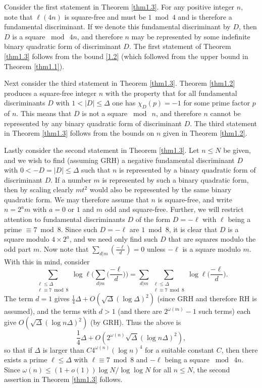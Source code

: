 \documentclass[11pt,makeidx, reqno]{amsart}
\theoremstyle{mystyle}
\theoremstyle{definition}
\begin{document}
 
Consider the first statement in Theorem \ref{thm1.3}.  For any positive integer $n$, note that $\ell(4n)$ is square-free and must be $1\bmod 4$ and is therefore a fundamental discriminant.  If we denote this fundamental discriminant by $D$, then $D$ is a square  $\bmod \ {4n}$, and therefore $n$ may be represented by some indefinite binary quadratic form of discriminant $D$.   The first statement of Theorem \ref{thm1.3} follows from the bound \eqref{1.2} (which followed from the upper bound in Theorem \ref{thm1.1}).   

 Next consider the third statement in Theorem \ref{thm1.3}.  Theorem \ref{thm1.2} produces a square-free integer $n$ with the property that for all fundamental discriminants $D$ with $1<|D|\le \Delta$ one has $\chi_D(p)=-1$ for some prime factor $p$ of $n$.  This means that $D$ is not a square $\bmod \ n$, and therefore $n$ cannot be represented by any binary quadratic form of discriminant $D$.  The third statement in Theorem \ref{thm1.3} follows from the bounds on $n$ given in Theorem \ref{thm1.2}.  

 Lastly consider the second statement in Theorem \ref{thm1.3}.  Let $n \le N$ be given, and we wish to find (assuming GRH) a negative fundamental discriminant $D$ with $0 < -D =|D|\le \Delta$ such that $n$ is represented by a binary quadratic form of discriminant $D$.  If a number $m$ is represented by such a binary quadratic form, then by scaling clearly $mt^2$ would also be represented by the same binary quadratic form.  We may therefore assume that $n$ is square-free, and write $n=2^a m$ with $a=0$ or $1$ and $m$ odd and square-free.  Further, we will restrict attention to fundamental discriminants $D$ of the form $D=-\ell$ with $\ell$ being a prime $\equiv 7 \bmod 8$.  Since such $D=-\ell$ are $1 \bmod {8}$, it is clear that $D$ is a square modulo $4 \times 2^a$, and we need only find such $D$ that are squares modulo the odd part $m$.  Now note that $\sum_{d|m} (\frac{-\ell}{d}) = 0$ unless $-\ell$ is a square modulo ${m}$.  With this in mind, consider 
 $$
 \sum_{\substack{ \ell \le \Delta \\ \ell\equiv 7 \bmod 8}} \log \ell \Big(\sum_{d|m} \Big(\frac{-\ell}{d}\Big) \Big)
 = \sum_{d|m} \sum_{\substack{ \ell \le \Delta \\ \ell\equiv 7 \bmod 8}} \log \ell \Big(\frac{-\ell}{d}\Big). 
 $$
The term $d=1$ gives $\tfrac 14 \Delta +O(\sqrt{\Delta} (\log \Delta)^2)$ (since GRH and therefore RH is assumed), and the terms with $d>1$ (and there are $2^{\omega(m)}-1$ such terms) each give $O(\sqrt{\Delta} (\log n\Delta)^2)$ (by GRH).   Thus the above is 
$$ 
\frac 14 \Delta + O( 2^{\omega(n)} \sqrt{\Delta} (\log n\Delta)^2), 
$$
so that if $\Delta$ is larger than $C 4^{\omega(n)} (\log n)^4$ for a suitable constant $C$, then there exists a prime $\ell \le \Delta$ with $\ell \equiv 7 \bmod 8$ and $-\ell$ being a square  $\bmod\  {4n}$. Since $\omega(n) \le (1+o(1)) \log N/\log \log N$ for all $n\le N$, the second assertion in Theorem \ref{thm1.3} follows.
\end{document}

